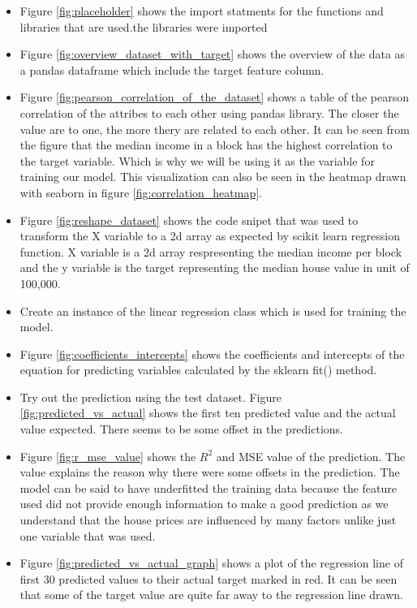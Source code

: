 \documentclass[conference]{IEEEtran}
\begin{document}
	\begin{itemize}
		\item Figure \ref{fig:placeholder} shows the import statments for the functions and libraries that are used.the libraries were imported
		\item Figure \ref{fig:overview_dataset_with_target} shows the overview of the data as a  pandas dataframe which include the target feature column.
		\item Figure \ref{fig:pearson_correlation_of_the_dataset} shows a table of the pearson correlation of the attribes to each other using pandas library. The closer the value are to one, the more thery are related to each other. It can be seen from the figure that the median income in a block has the highest correlation to the target variable. Which is why we will be using it as the variable for training our model. This visualization can also be seen in the heatmap drawn with seaborn in figure \ref{fig:correlation_heatmap}.
		\item Figure \ref{fig:reshape_dataset} shows the code snipet that was used to transform the X variable to a 2d array as expected by scikit learn regression function. X variable is a 2d array respresenting the median income per block and the y variable is the target representing the median house value in unit of 100,000.
		\item Create an instance of the linear regression class which is used for training the model.
		\item Figure \ref{fig:coefficients_intercepts} shows the coefficients and intercepts of the equation for predicting variables calculated by the sklearn fit() method.
		\item Try out the prediction using the test dataset. Figure \ref{fig:predicted_vs_actual} shows the first ten predicted value and the actual value expected. There seems to be some offset in the predictions.
		\item Figure \ref{fig:r_mse_value} shows the $R^2$ and MSE value of the prediction. The value explains the reason why there were some offsets in the prediction. The model can be said to have underfitted the training data because the feature used did not provide enough information to make a good prediction as we understand that the house prices are influenced by many factors unlike just one variable that was used.
		\item Figure \ref{fig:predicted_vs_actual_graph} shows a plot of the regression line of first 30 predicted values to their actual target marked in red. It can be seen that some of the target value are quite far away to the regression line drawn.
		

\end{itemize}
\end{document}
